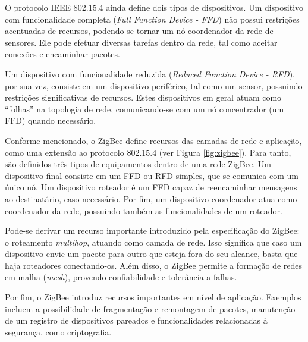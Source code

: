 O protocolo IEEE 802.15.4 ainda define dois tipos de dispositivos. Um dispositivo com funcionalidade completa (\textit{Full Function Device - FFD}) não possui restrições acentuadas de recursos, podendo se tornar um nó coordenador da rede de sensores. Ele pode efetuar diversas tarefas dentro da rede, tal como aceitar conexões e encaminhar pacotes. 

Um dispositivo com funcionalidade reduzida (\textit{Reduced Function Device - RFD}), por sua vez, consiste em um dispositivo periférico, tal como um sensor, possuindo restrições significativas de recursos. Estes dispositivos em geral atuam como ``folhas'' na topologia de rede, comunicando-se com um nó concentrador (um FFD) quando necessário.

Conforme mencionado, o ZigBee define recursos das camadas de rede e aplicação, como uma extensão ao protocolo 802.15.4 (ver Figura \ref{fig:zigbee}). Para tanto, são definidos três tipos de equipamentos dentro de uma rede ZigBee. Um dispositivo final consiste em um FFD ou RFD simples, que se comunica com um único nó. Um dispositivo roteador é um FFD capaz de reencaminhar mensagens  ao destinatário, caso necessário. Por fim, um dispositivo coordenador atua como coordenador da rede, possuindo também as funcionalidades de um roteador.

Pode-se derivar um recurso importante introduzido pela especificação do ZigBee: o roteamento \textit{multihop}, atuando como camada de rede. Isso significa que caso um dispositivo envie um pacote para outro que esteja fora do seu alcance, basta que haja roteadores conectando-os. Além disso, o ZigBee permite a formação de redes em malha (\textit{mesh}), provendo confiabilidade e tolerância a falhas.

Por fim, o ZigBee introduz recursos importantes em nível de aplicação. Exemplos incluem a possibilidade de fragmentação e remontagem de pacotes, manutenção de um registro de dispositivos pareados e funcionalidades relacionadas à segurança, como criptografia.


